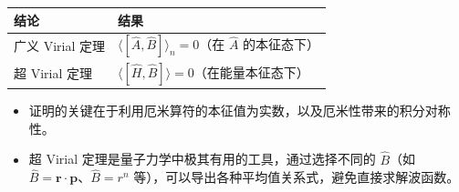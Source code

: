\begin{formulabox}[答案汇总]
\begin{center}
\begin{tabular}{ll}
\toprule
\textbf{结论} & \textbf{结果} \\
\midrule
广义 Virial 定理 & $\langle[\hat A,\hat B]\rangle_n=0$（在 $\hat A$ 的本征态下） \\
超 Virial 定理 & $\langle[\hat H,\hat B]\rangle=0$（在能量本征态下） \\
\bottomrule
\end{tabular}
\end{center}
\end{formulabox}

\begin{insightbox}[物理图像]
\begin{itemize}
    \item 证明的关键在于利用厄米算符的本征值为实数，以及厄米性带来的积分对称性。
    \item 超 Virial 定理是量子力学中极其有用的工具，通过选择不同的 $\hat B$（如 $\hat B=\mathbf{r}\cdot\mathbf{p}$、$\hat B=r^n$ 等），可以导出各种平均值关系式，避免直接求解波函数。
\end{itemize}
\end{insightbox}
